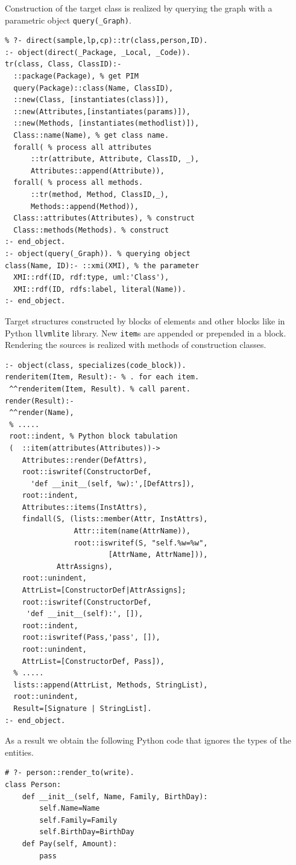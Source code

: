 \documentclass[conference,a4paper]{IEEEtran}
\begin{document}
Construction of the target class is realized by querying the graph with a parametric object \texttt{query(\_Graph)}.
\begin{verbatim}
% ?- direct(sample,lp,cp)::tr(class,person,ID).
:- object(direct(_Package, _Local, _Code)).
tr(class, Class, ClassID):-
  ::package(Package), % get PIM
  query(Package)::class(Name, ClassID),
  ::new(Class, [instantiates(class)]),
  ::new(Attributes,[instantiates(params)]),
  ::new(Methods, [instantiates(methodlist)]),
  Class::name(Name), % get class name.
  forall( % process all attributes
      ::tr(attribute, Attribute, ClassID, _),
      Attributes::append(Attribute)),
  forall( % process all methods.
      ::tr(method, Method, ClassID,_),
      Methods::append(Method)),
  Class::attributes(Attributes), % construct
  Class::methods(Methods). % construct
:- end_object.
:- object(query(_Graph)). % querying object
class(Name, ID):- ::xmi(XMI), % the parameter
  XMI::rdf(ID, rdf:type, uml:'Class'),
  XMI::rdf(ID, rdfs:label, literal(Name)).
:- end_object.
\end{verbatim}

Target structures constructed by blocks of elements and other blocks like in Python \texttt{llvmlite} library.  New \texttt{item}s are appended or prepended in a block.  Rendering the sources is realized with methods of construction classes.

\begin{verbatim}
:- object(class, specializes(code_block)).
renderitem(Item, Result):- % . for each item.
 ^^renderitem(Item, Result). % call parent.
render(Result):-
 ^^render(Name),
 % .....
 root::indent, % Python block tabulation
 (  ::item(attributes(Attributes))->
    Attributes::render(DefAttrs),
    root::iswritef(ConstructorDef,
      'def __init__(self, %w):',[DefAttrs]),
    root::indent,
    Attributes::items(InstAttrs),
    findall(S, (lists::member(Attr, InstAttrs),
                Attr::item(name(AttrName)),
                root::iswritef(S, "self.%w=%w",
                        [AttrName, AttrName])),
            AttrAssigns),
    root::unindent,
    AttrList=[ConstructorDef|AttrAssigns];
    root::iswritef(ConstructorDef,
     'def __init__(self):', []),
    root::indent,
    root::iswritef(Pass,'pass', []),
    root::unindent,
    AttrList=[ConstructorDef, Pass]),
  % .....
  lists::append(AttrList, Methods, StringList),
  root::unindent,
  Result=[Signature | StringList].
:- end_object.
\end{verbatim}

As a result we obtain the following Python code that ignores the types of the entities.
\begin{verbatim}
# ?- person::render_to(write).
class Person:
    def __init__(self, Name, Family, BirthDay):
        self.Name=Name
        self.Family=Family
        self.BirthDay=BirthDay
    def Pay(self, Amount):
        pass
\end{verbatim}
\end{document}
